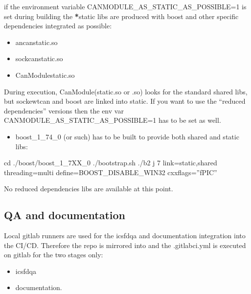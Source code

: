 \documentclass[a4paper,10pt,english]{sphinxmanual}
\begin{document}
\sphinxAtStartPar
{}
if the environment variable CANMODULE\_AS\_STATIC\_AS\_POSSIBLE=1 is set during building the {\color{red}\bfseries{}*}\sphinxhyphen{}static
libs are produced with boost and other specific dependencies integrated as possible:
\begin{itemize}
\item {} 
\sphinxAtStartPar
ancan\sphinxhyphen{}static.so

\item {} 
\sphinxAtStartPar
sockcan\sphinxhyphen{}static.so

\item {} 
\sphinxAtStartPar
CanModule\sphinxhyphen{}static.so

\end{itemize}

\sphinxAtStartPar
During execution, CanModule(\sphinxhyphen{}static.so or .so) looks for the standard shared libs, but sockewtcan and boost
are linked into static.
If you want to use the “reduced dependencies” versions then the env var CANMODULE\_AS\_STATIC\_AS\_POSSIBLE=1
has to be set  as well.
\begin{itemize}
\item {} 
\sphinxAtStartPar
boost\_1\_74\_0 (or such) has to be built to provide both shared and static libs:

\end{itemize}

\begin{sphinxVerbatim}[commandchars=\\\{\}]

\end{sphinxVerbatim}

\sphinxAtStartPar
cd ./boost/boost\_1\_7XX\_0
./bootstrap.sh
./b2 \sphinxhyphen{}j 7 link=static,shared threading=multi define=BOOST\_DISABLE\_WIN32 cxxflags=”\sphinxhyphen{}fPIC”

\sphinxAtStartPar
{}

\sphinxAtStartPar
No reduced dependencies libs are available at this point.


\subsection{QA and documentation}
\label{\detokenize{building:qa-and-documentation}}
\sphinxAtStartPar
Local gitlab runners are used for the ics\sphinxhyphen{}fd\sphinxhyphen{}qa and documentation integration into the CI/CD. Therefore the 
repo is mirrored into  and the .gitlab\sphinxhyphen{}ci.yml is executed on gitlab for the two stages only:
\begin{itemize}
\item {} 
\sphinxAtStartPar
ics\sphinxhyphen{}fd\sphinxhyphen{}qa

\item {} 
\sphinxAtStartPar
documentation.

\end{itemize}
\end{document}
